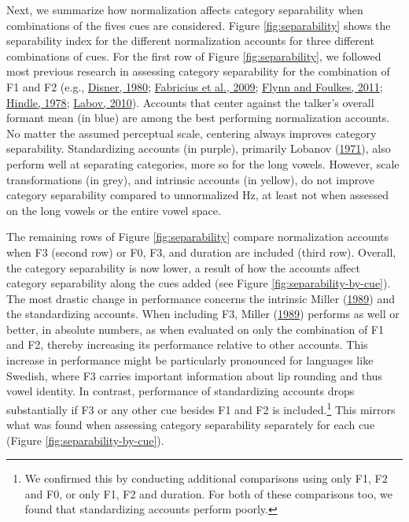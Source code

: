 \documentclass[utf8]{frontiers_suppmat} %
\begin{document}
Next, we summarize how normalization affects category separability when combinations of the fives cues are considered. Figure \ref{fig:separability} shows the separability index for the different normalization accounts for three different combinations of cues. For the first row of Figure \ref{fig:separability}, we followed most previous research in assessing category separability for the combination of F1 and F2 (e.g., \protect\hyperlink{ref-disner1980}{Disner, 1980}; \protect\hyperlink{ref-fabricius2009}{Fabricius et al., 2009}; \protect\hyperlink{ref-Flynn2011}{Flynn and Foulkes, 2011}; \protect\hyperlink{ref-hindle1978}{Hindle, 1978}; \protect\hyperlink{ref-labov2010}{Labov, 2010}). Accounts that center against the talker's overall formant mean (in blue) are among the best performing normalization accounts. No matter the assumed perceptual scale, centering always improves category separability. Standardizing accounts (in purple), primarily Lobanov (\protect\hyperlink{ref-lobanov1971}{1971}), also perform well at separating categories, more so for the long vowels. However, scale transformations (in grey), and intrinsic accounts (in yellow), do not improve category separability compared to unnormalized Hz, at least not when assessed on the long vowels or the entire vowel space.

The remaining rows of Figure \ref{fig:separability} compare normalization accounts when F3 (second row) or F0, F3, and duration are included (third row). Overall, the category separability is now lower, a result of how the accounts affect category separability along the cues added (see Figure \ref{fig:separability-by-cue}). The most drastic change in performance concerns the intrinsic Miller (\protect\hyperlink{ref-miller1989c}{1989}) and the standardizing accounts. When including F3, Miller (\protect\hyperlink{ref-miller1989c}{1989}) performs as well or better, in absolute numbers, as when evaluated on only the combination of F1 and F2, thereby increasing its performance relative to other accounts. This increase in performance might be particularly pronounced for languages like Swedish, where F3 carries important information about lip rounding and thus vowel identity. In contrast, performance of standardizing accounts drops substantially if F3 or any other cue besides F1 and F2 is included.\footnote{We confirmed this by conducting additional comparisons using only F1, F2 and F0, or only F1, F2 and duration. For both of these comparisons too, we found that standardizing accounts perform poorly.} This mirrors what was found when assessing category separability separately for each cue (Figure \ref{fig:separability-by-cue}).
\end{document}
